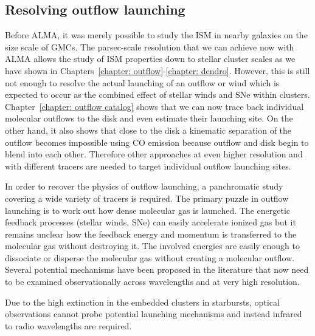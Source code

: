 
\subsection{Resolving outflow launching}

Before ALMA, it was merely possible to study the ISM in nearby galaxies on the size scale of GMCs. The parsec-scale resolution that we can achieve now with ALMA allows the study of ISM properties down to stellar cluster scales as we have shown in Chapters~\ref{chapter: outflow}-\ref{chapter: dendro}.
However, this is still not enough to resolve the actual launching of an outflow or wind which is expected to occur as the combined effect of stellar winds and SNe within clusters.
Chapter~\ref{chapter: outflow catalog} shows that we can now trace back individual molecular outflows to the disk and even estimate their launching site. On the other hand, it also shows that close to the disk a kinematic separation of the outflow becomes impossible using CO emission because outflow and disk begin to blend into each other.
Therefore other approaches at even higher resolution and with different tracers are needed to target individual outflow launching sites.

In order to recover the physics of outflow launching, a panchromatic study covering a wide variety of tracers is required.
The primary puzzle in outflow launching is to work out how dense molecular gas is launched.
The energetic feedback processes (stellar winds, SNe) can easily accelerate ionized gas but it remains unclear how the feedback energy and momentum is transferred to the molecular gas without destroying it. The involved energies are easily enough to dissociate or disperse the molecular gas without creating a molecular outflow.
Several potential mechanisms have been proposed in the literature that now need to be examined observationally across wavelengths and at very high resolution.

Due to the high extinction in the embedded clusters in starbursts, optical observations cannot probe potential launching mechanisms and instead infrared to radio wavelengths are required.

